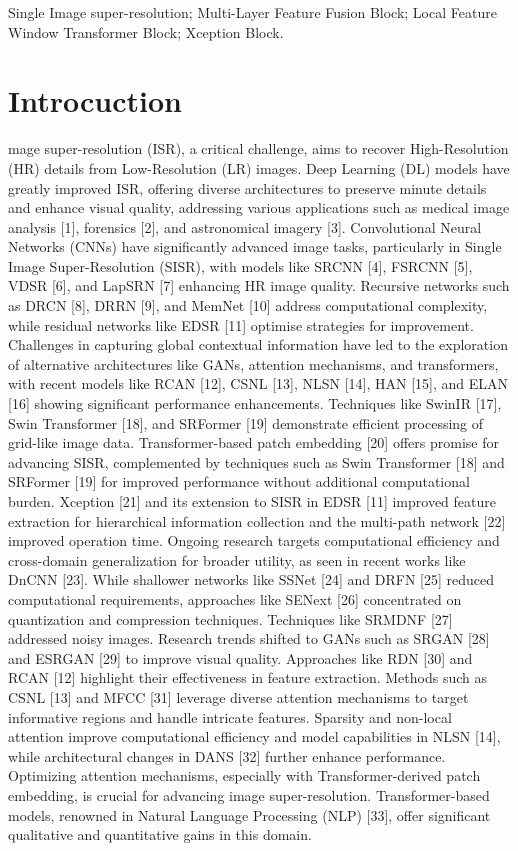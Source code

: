 \documentclass[journal]{IEEEtran}
\begin{document}
\begin{IEEEkeywords}
Single Image super-resolution; Multi-Layer Feature Fusion Block; Local Feature Window Transformer Block; Xception Block.
\end{IEEEkeywords}

\IEEEpeerreviewmaketitle

\section{Introcuction}

mage super-resolution (ISR), a critical challenge, aims to recover High-Resolution (HR) details from Low-Resolution (LR) images. Deep Learning (DL) models have greatly improved ISR, offering diverse architectures to preserve minute details and enhance visual quality, addressing various applications such as medical image analysis [1], forensics [2], and astronomical imagery [3]. 
Convolutional Neural Networks (CNNs) have significantly advanced image tasks, particularly in Single Image Super-Resolution (SISR), with models like SRCNN [4], FSRCNN [5], VDSR [6], and LapSRN [7] enhancing HR image quality. Recursive networks such as DRCN [8], DRRN [9], and MemNet [10] address computational complexity, while residual networks like EDSR [11] optimise strategies for improvement. Challenges in capturing global contextual information have led to the exploration of alternative architectures like GANs, attention mechanisms, and transformers, with recent models like RCAN [12], CSNL [13], NLSN [14], HAN [15], and ELAN [16] showing significant performance enhancements. Techniques like SwinIR [17], Swin Transformer [18], and SRFormer [19] demonstrate efficient processing of grid-like image data. Transformer-based patch embedding [20] offers promise for advancing SISR, complemented by techniques such as Swin Transformer [18] and SRFormer [19] for improved performance without additional computational burden. Xception [21] and its extension to SISR in EDSR [11] improved feature extraction for hierarchical information collection and the multi-path network [22] improved operation time. Ongoing research targets computational efficiency and cross-domain generalization for broader utility, as seen in recent works like DnCNN [23]. While shallower networks like SSNet [24] and DRFN [25] reduced computational requirements, approaches like SENext [26] concentrated on quantization and compression techniques. Techniques like SRMDNF [27] addressed noisy images. Research trends shifted to GANs such as SRGAN [28] and ESRGAN [29] to improve visual quality. Approaches like RDN [30] and RCAN [12] highlight their effectiveness in feature extraction. Methods such as CSNL [13] and MFCC [31] leverage diverse attention mechanisms to target informative regions and handle intricate features. Sparsity and non-local attention improve computational efficiency and model capabilities in NLSN [14], while architectural changes in DANS [32] further enhance performance. Optimizing attention mechanisms, especially with Transformer-derived patch embedding, is crucial for advancing image super-resolution. Transformer-based models, renowned in Natural Language Processing (NLP) [33], offer significant qualitative and quantitative gains in this domain. 
\end{document}

